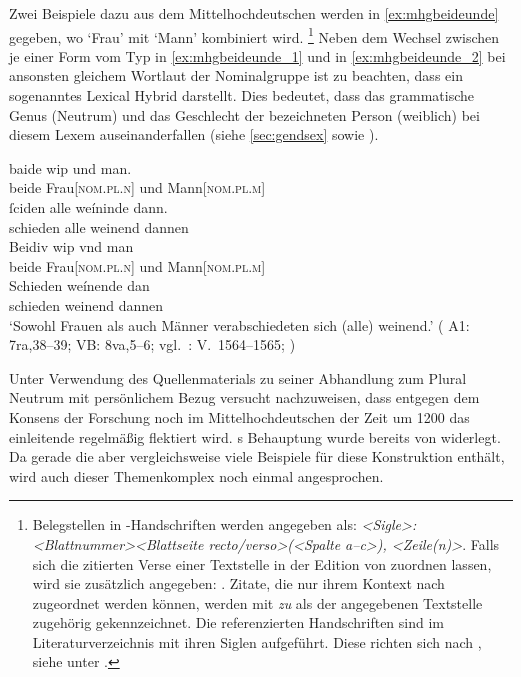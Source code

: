 Zwei Beispiele dazu aus dem Mittelhochdeutschen werden in
\cref{ex:mhgbeideunde} gegeben, wo  `Frau' mit 
`Mann' kombiniert wird.%
%
	\footnote{Belegstellen in \KC{}-Handschriften werden angegeben als:
		\textit{<Sigle>: <Blattnummer><Blattseite recto/verso>(<Spalte a--c>),%
		<Zeile(n)>}. Falls sich die zitierten Verse einer Textstelle in der
		Edition von \citet{schroeder1895} zuordnen lassen, wird sie zusätzlich
		angegeben: \textit{\cite[vgl. (abweichend)][<Seite>
		{[=~V.~<Vers>]}]{schroeder1895}}. Zitate, die nur ihrem Kontext nach
		zugeordnet werden können, werden mit \textit{zu} als der angegebenen
		Textstelle zugehörig gekennzeichnet. Die referenzierten Handschriften
		sind im Literaturverzeichnis mit ihren Siglen aufgeführt. Diese richten
		sich nach , siehe unter
		\nocite{kcdigital}.%
	}
%
Neben dem Wechsel zwischen je einer Form vom Typ  in
\cref{ex:mhgbeideunde_1} und  in \cref{ex:mhgbeideunde_2} bei
ansonsten gleichem Wortlaut der Nominalgruppe ist zu beachten, dass 
ein sogenanntes Lexical Hybrid darstellt. Dies bedeutet, dass das grammatische
Genus (Neutrum) und das Geschlecht der bezeichneten Person (weiblich) bei
diesem Lexem auseinanderfallen (siehe \cref{sec:gendsex} sowie
\cite[183--184]{corbett1991}).

\begin{exe}
\ex \label{ex:mhgbeideunde}
	\begin{xlist}
	\ex \label{ex:mhgbeideunde_1}
		\gll baide wip und man. \\
			beide Frau[\textsc{nom.pl.n}] und Mann[\textsc{nom.pl.m}] \\
	\sn \gll ſciden alle weíninde dann. \\
			schieden alle weinend dannen \\

	\ex \label{ex:mhgbeideunde_2}
		\gll Beidiv wip vnd man \\
			beide Frau[\textsc{nom.pl.n}] und Mann[\textsc{nom.pl.m}] \\
	\sn \gll Schieden weínende dan \\
			schieden weinend dannen \\
		\trans `Sowohl Frauen als auch Männer verabschiedeten sich (alle)
			weinend.'
			(%
				A1: 7ra,38--39;
				VB: 8va,5--6;
				vgl.~\KC: V.~1564--1565; \cite[110]{schroeder1895}%
			)
	\end{xlist}
\end{exe}

Unter Verwendung des Quellenmaterials zu seiner Abhandlung zum Plural Neutrum
mit persönlichem Bezug \autocite{askedal1973} versucht \citet{askedal1974}
nachzuweisen, dass entgegen dem Konsens der Forschung
\autocites[vgl.~z.\,B.][433]{behaghel1923}[133]{dal2014}[626]{ksw2} noch im
Mittelhochdeutschen der Zeit um 1200 das einleitende  regelmäßig
flektiert wird. \citeauthor{askedal1974}s Behauptung wurde bereits von
\citet{gjelsten1980} widerlegt. Da gerade die \KC{} aber vergleichsweise
viele Beispiele für diese Konstruktion enthält, wird auch dieser Themenkomplex
noch einmal angesprochen.

